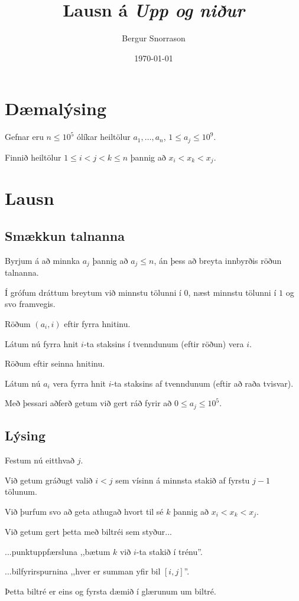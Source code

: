 \title{Lausn á \emph{Upp og niður}}
\author{Bergur Snorrason}
\date{\today}



\frame{\titlepage}

\section{Dæmalýsing}
{
	{
		\item<1-> Gefnar eru $n \leq 10^5$ ólíkar heiltölur $a_1, \dots, a_n$, $1 \leq a_j \leq 10^9$.
		\item<2-> Finnið heiltölur $1 \leq i < j < k \leq n$ þannig að $x_i < x_k < x_j$.
	}
}

\section{Lausn}
\subsection{Smækkun talnanna}
{
	{
		\item<1-> Byrjum á að minnka $a_j$ þannig að $a_j \leq n$, án þess að breyta innbyrðis röðun talnanna.
		\item<2-> Í grófum dráttum breytum við minnstu tölunni í $0$, næst minnstu tölunni í $1$ og svo framvegis.
		{
			\item<3-> Röðum $(a_i, i)$ eftir fyrra hnitinu.
			\item<4-> Látum nú fyrra hnit $i$-ta staksins í tvenndunum (eftir röðun) vera $i$.
			\item<5-> Röðum eftir seinna hnitinu.
			\item<6-> Látum nú $a_i$ vera fyrra hnit $i$-ta staksins af tvenndunum (eftir að raða tvisvar).
		}
		\item<7-> Með þessari aðferð getum við gert ráð fyrir að $0 \leq a_j \leq 10^5$.
	}
}

\subsection{Lýsing}
{
	{
		\item<1-> Festum nú eitthvað $j$.
		\item<2-> Við getum gráðugt valið $i < j$ sem vísinn á minnsta stakið af fyrstu $j - 1$ tölunum.
		\item<3-> Við þurfum svo að geta athugað hvort til sé $k$ þannig að $x_i < x_k < x_j$.
		\item<4-> Við getum gert þetta með biltréi sem styður...
		{
			\item<5-> ...punktuppfærsluna ,,bætum $k$ við $i$-ta stakið í trénu''.
			\item<6-> ...bilfyrirspurnina ,,hver er summan yfir bil $[i, j]$''.
		}
		\item<7-> Þetta biltré er eins og fyrsta dæmið í glærunum um biltré.
	}
}

